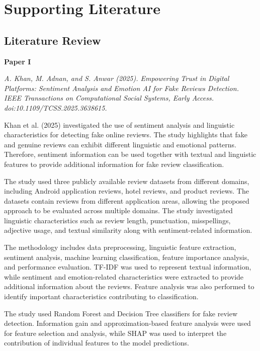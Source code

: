 \documentclass[12pt,a4paper]{report}
\begin{document}
\newpage
\chapter{Supporting Literature}

\section{Literature Review}


\textbf{Paper I}

\textit{A. Khan, M. Adnan, and S. Anwar (2025). Empowering Trust in Digital Platforms: Sentiment Analysis and Emotion AI for Fake Reviews Detection. IEEE Transactions on Computational Social Systems, Early Access. doi:10.1109/TCSS.2025.3638615.}

Khan et al. (2025) investigated the use of sentiment analysis and linguistic characteristics for detecting fake online reviews. The study highlights that fake and genuine reviews can exhibit different linguistic and emotional patterns. Therefore, sentiment information can be used together with textual and linguistic features to provide additional information for fake review classification.

The study used three publicly available review datasets from different domains, including Android application reviews, hotel reviews, and product reviews. The datasets contain reviews from different application areas, allowing the proposed approach to be evaluated across multiple domains. The study investigated linguistic characteristics such as review length, punctuation, misspellings, adjective usage, and textual similarity along with sentiment-related information.

The methodology includes data preprocessing, linguistic feature extraction, sentiment analysis, machine learning classification, feature importance analysis, and performance evaluation. TF-IDF was used to represent textual information, while sentiment and emotion-related characteristics were extracted to provide additional information about the reviews. Feature analysis was also performed to identify important characteristics contributing to classification.

The study used Random Forest and Decision Tree classifiers for fake review detection. Information gain and approximation-based feature analysis were used for feature selection and analysis, while SHAP was used to interpret the contribution of individual features to the model predictions.
\end{document}
